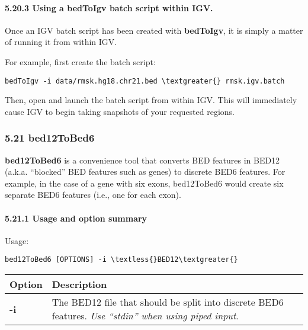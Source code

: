 \documentclass[letterpaper,10pt,english]{sphinxmanual}
\begin{document}
\paragraph{5.20.3 Using a bedToIgv batch script within IGV.}
\label{content/bedToIgv:using-a-bedtoigv-batch-script-within-igv}
Once an IGV batch script has been created with \textbf{bedToIgv}, it is simply a matter of running it from
within IGV.

For example, first create the batch script:

\begin{Verbatim}[commandchars=\\\{\}]
bedToIgv -i data/rmsk.hg18.chr21.bed \textgreater{} rmsk.igv.batch
\end{Verbatim}

Then, open and launch the batch script from within IGV. This will immediately cause IGV to begin
taking snapshots of your requested regions.


\subsubsection{5.21 bed12ToBed6}
\label{content/bed12ToBed6::doc}\label{content/bed12ToBed6:bed12tobed6}
\textbf{bed12ToBed6} is a convenience tool that converts BED features in BED12 (a.k.a. ``blocked'' BED
features such as genes) to discrete BED6 features. For example, in the case of a gene with six exons,
bed12ToBed6 would create six separate BED6 features (i.e., one for each exon).


\paragraph{5.21.1 Usage and option summary}
\label{content/bed12ToBed6:usage-and-option-summary}
Usage:

\begin{Verbatim}[commandchars=\\\{\}]
bed12ToBed6 [OPTIONS] -i \textless{}BED12\textgreater{}
\end{Verbatim}

\begin{tabulary}{\linewidth}{|L|L|}
\hline
\textbf{
Option
} & \textbf{
Description
}\\\hline

\textbf{-i}
 & 
The BED12 file that should be split into discrete BED6 features. \emph{Use ``stdin'' when using piped input}.
\\\hline
\end{tabulary}
\end{document}
